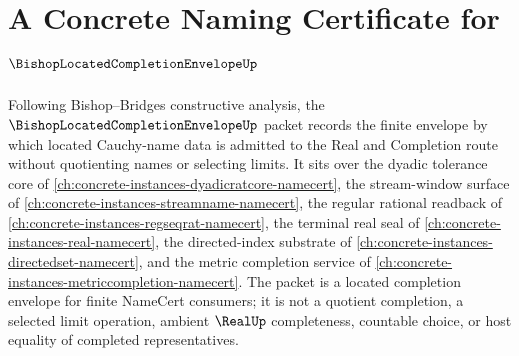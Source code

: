 \chapter{A Concrete Naming Certificate for $\BishopLocatedCompletionEnvelopeUp$}
\label{ch:concrete-instances-bishop-located-completion-envelope-namecert}

Following Bishop--Bridges constructive analysis, the $\BishopLocatedCompletionEnvelopeUp$ packet records the finite envelope by which located Cauchy-name data is admitted to the Real and Completion route without quotienting names or selecting limits. It sits over the dyadic tolerance core of \autoref{ch:concrete-instances-dyadicratcore-namecert}, the stream-window surface of \autoref{ch:concrete-instances-streamname-namecert}, the regular rational readback of \autoref{ch:concrete-instances-regseqrat-namecert}, the terminal real seal of \autoref{ch:concrete-instances-real-namecert}, the directed-index substrate of \autoref{ch:concrete-instances-directedset-namecert}, and the metric completion service of \autoref{ch:concrete-instances-metriccompletion-namecert}. The packet is a located completion envelope for finite NameCert consumers; it is not a quotient completion, a selected limit operation, ambient $\RealUp$ completeness, countable choice, or host equality of completed representatives.

